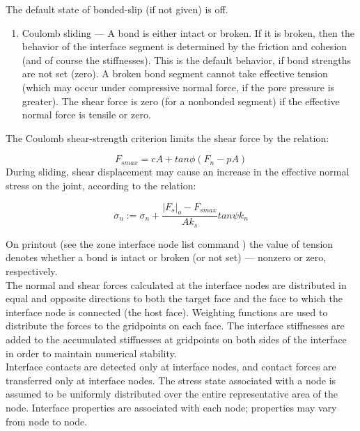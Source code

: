 \documentclass[a4paper, nobind]{templates/ociamthesis}
\providecommand{\tightlist}{%
  \setlength{\itemsep}{0pt}\setlength{\parskip}{0pt}}
\begin{document}
The default state of bonded-slip (if not given) is off.

\begin{enumerate}
\def\labelenumi{\arabic{enumi}.}
\setcounter{enumi}{2}
\tightlist
\item
  Coulomb sliding --- A bond is either intact or broken. If it is
  broken, then the behavior of the interface segment is determined by
  the friction and cohesion (and of course the stiffnesses). This is
  the default behavior, if bond strengths are not set (zero). A broken
  bond segment cannot take effective tension (which may occur under
  compressive normal force, if the pore pressure is greater). The
  shear force is zero (for a nonbonded segment) if the effective
  normal force is tensile or zero.\\
\end{enumerate}

The Coulomb shear-strength criterion limits the shear force by the
relation:

\[ F_{smax} = c A + tan\phi (F_n - pA)\] During sliding, shear
displacement may cause an increase in the effective normal stress on the
joint, according to the relation:

\[\sigma_n := \sigma_n + \frac{|F_s|_o - F_{smax}}{A k_s} tan\psi k_n\]

On printout (see the zone interface node list command ) the value of
tension denotes whether a bond is intact or broken (or not set) ---
nonzero or zero, respectively.\\

The normal and shear forces calculated at the interface nodes are
distributed in equal and opposite directions to both the target face and
the face to which the interface node is connected (the host face).
Weighting functions are used to distribute the forces to the gridpoints
on each face. The interface stiffnesses are added to the accumulated
stiffnesses at gridpoints on both sides of the interface in order to
maintain numerical stability.\\

Interface contacts are detected only at interface nodes, and contact
forces are transferred only at interface nodes. The stress state
associated with a node is assumed to be uniformly distributed over the
entire representative area of the node. Interface properties are
associated with each node; properties may vary from node to node.\\
\end{document}
